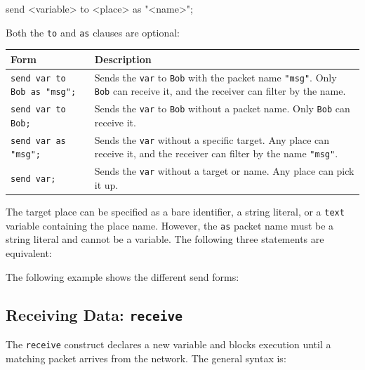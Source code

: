 \begin{codebox}
send <variable> to <place> as "<name>";
\end{codebox}

Both the \texttt{to} and \texttt{as} clauses are optional:

\begin{center}
\begin{tabular}{|l|p{9cm}|}
\hline
\textbf{Form} & \textbf{Description} \\
\hline
\texttt{send var to Bob as "msg";} &
    Sends the \texttt{var} to \texttt{Bob} with the packet name \texttt{"msg"}. Only
    \texttt{Bob} can receive it, and the receiver can filter by the name. \\
\hline
\texttt{send var to Bob;} &
    Sends the \texttt{var} to \texttt{Bob} without a packet name. Only \texttt{Bob}
    can receive it. \\
\hline
\texttt{send var as "msg";} &
    Sends the \texttt{var} without a specific target. Any place can receive it, and
    the receiver can filter by the name \texttt{"msg"}. \\
\hline
\texttt{send var;} &
    Sends the \texttt{var} without a target or name. Any place can pick it up. \\
\hline
\end{tabular}
\end{center}

\newpage
The target place can be specified as a bare identifier, a string literal, or a \texttt{text} 
variable containing the place name. However, the \texttt{as} packet name must be a string 
literal and cannot be a variable. The following three statements are equivalent:



The following example shows the different send forms:



\subsection{Receiving Data: \texttt{receive}}
\label{sec:receive}

The \texttt{receive} construct declares a new variable and blocks execution
until a matching packet arrives from the network. The general syntax is:


